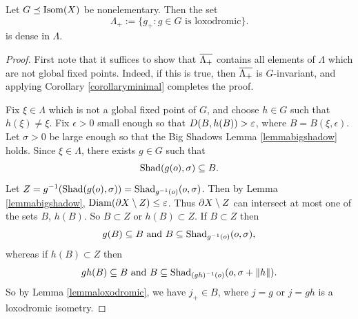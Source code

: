 \begin{proposition}
\label{propositionminimal2}
Let $G\preceq\operatorname{Isom}(X)$ be nonelementary. Then the set
\[
\Lambda_+ := \{g_+ : g\in G \text{ is loxodromic}\}.
\]
is dense in $\Lambda$.
\end{proposition}
\begin{proof}
First note that it suffices to show that $\overline{\Lambda_+}$ contains all elements of $\Lambda$ which are not global fixed points. Indeed, if this is true, then $\overline{\Lambda_+}$ is $G$-invariant, and applying Corollary \ref{corollaryminimal} completes the proof.

Fix $\xi\in\Lambda$ which is not a global fixed point of $G$, and choose $h\in G$ such that $h(\xi)\neq \xi$. Fix $\epsilon > 0$ small enough so that $D(B,h(B)) > \varepsilon$, where $B = B(\xi,\epsilon)$. Let $\sigma > 0$ be large enough so that the Big Shadows Lemma \ref{lemmabigshadow} holds. Since $\xi\in\Lambda$, there exists $g\in G$ such that
\[
\operatorname{Shad}(g(o),\sigma) \subseteq B.
\]
Let $Z = g^{-1}(\operatorname{Shad}(g(o),\sigma)) = \operatorname{Shad}_{g^{-1}(o)}(o,\sigma)$. Then by Lemma \ref{lemmabigshadow}, $\operatorname{Diam}(\partial X\setminus Z)\leq\varepsilon$. Thus $\partial X\setminus Z$ can intersect at most one of the sets $B$, $h(B)$. So $B\subset Z$ or $h(B)\subset Z$. If $B\subset Z$ then
\[
g(B) \subseteq B \textup{ and } B \subseteq \operatorname{Shad}_{g^{-1}(o)}(o,\sigma),
\]
whereas if $h(B)\subset Z$ then
\[
gh(B) \subseteq B \textup{ and } B \subseteq \operatorname{Shad}_{(gh)^{-1}(o)}(o,\sigma + \|h\|).
\]
So by Lemma \ref{lemmaloxodromic}, we have $j_+\in B$, where $j = g$ or $j = gh$ is a loxodromic isometry.
\end{proof}

